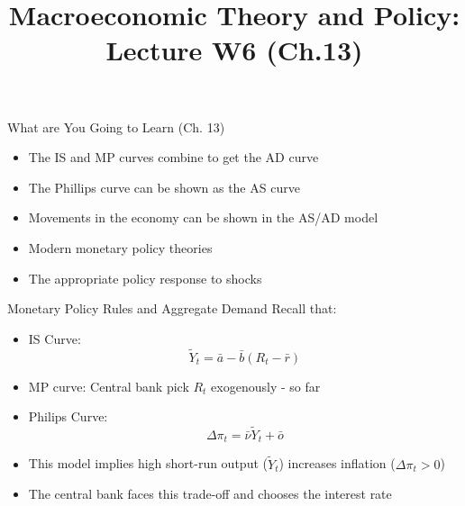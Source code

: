 \documentclass[aspectratio=1610]{beamer}
\title[Winter - Lecture 6] %
{Macroeconomic Theory and Policy: Lecture  W6 (Ch.13)}
\author[University of Toronto] %
{}
\date[] %
\begin{document}
\begin{frame}
  \titlepage
\end{frame}

\begin{frame}[wide]{What are You Going to Learn (Ch. 13)}
	\begin{itemize}
		\item The IS and MP curves combine to get the AD curve
		\vspace{2mm}
		\item The Phillips curve can be shown as the AS curve
		\vspace{2mm}
		\item Movements in the economy can be shown in the AS/AD model
		\vspace{2mm}
		\item Modern monetary policy theories
		\vspace{2mm}
		\item The appropriate policy response to shocks
	\end{itemize}
\end{frame}

\begin{frame}[wide]{Monetary Policy Rules and Aggregate Demand}
	Recall that:
	\begin{itemize}
		\vspace{2mm}
		\item IS Curve:
		\[\tilde{Y}_t = \bar{a} - \bar{b} \left(R_t -\bar{r}\right) \]
		\vspace{2mm}
		\item MP curve: Central bank pick $R_t$ exogenously - so far
		\vspace{2mm}
		\item Philips Curve: 
		\[\Delta \pi_t = \bar{\nu} \tilde{Y}_t +\bar{o}\]
		\vspace{2mm}
		\item This model implies high short-run output ($\tilde{Y}_t$) increases inflation ($\Delta \pi_t>0$)
		\vspace{2mm}
		\item The central bank faces this trade-off and chooses the interest rate
	\end{itemize}
\end{frame}
\end{document}
